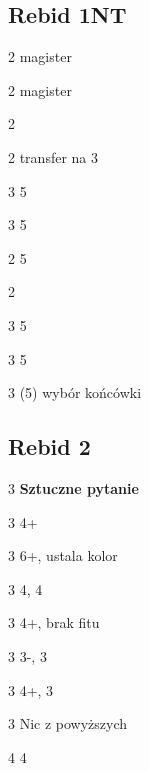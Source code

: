 \documentclass[12pt, a4paper]{article}
\begin{document}
\subsection*{Rebid 1NT}
\begin{options}[2]
    \item[2\clubs] magister
    \item[2\diams] magister
    \item[2\hearts] \soff
    \item[2\nt] transfer na 3\clubs \vimp
    \item[3\clubs] 5\clubs \gf \imp
    \item[3\diams] 5\diams \gf \imp
\end{options}

\begin{options}[2]
    \item[2\hearts] 5\hearts \inv
    \item[2\nt] \bal \inv 
    \item[3\clubs] 5\clubs \inv
    \item[3\diams] 5\diams \inv
    \item[3\nt] (5) wybór końcówki \vimp
\end{options}

\pagebreak
\subsection*{Rebid 2\nt}

\sequence{{1\clubs}{1\hearts}{2\ntx}}
\begin{options}[2]
    \item[3\clubs] \textbf{Sztuczne pytanie} \imp
    \item[3\diams] 4+\diams 
    \item[3\hearts] 6+\hearts, ustala kolor
    \item[3\spades] 4\hearts, 4\spades 
\end{options}

\sequence{{1\clubs}{1\hearts}{2\ntx}{3\clubs}}
\begin{options}[1]
    \item[3\diams] 4+\clubs, brak fitu \hearts
    \item[3\hearts] 3-\clubs, 3\hearts
    \item[3\spades] 4+\clubs, 3\hearts 
    \item[3\nt] Nic z powyższych
    \item[4\clubs] 4\hearts  
\end{options}
\end{document}
